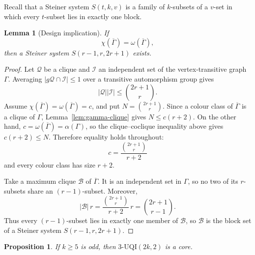 \documentclass[11pt]{article}
\newtheorem{lemma}[theorem]{Lemma}
\newtheorem{proposition}[theorem]{Proposition}
\begin{document}
Recall that a Steiner system \(S(t,k,v)\) is a family of \(k\)-subsets of a
\(v\)-set in which every \(t\)-subset lies in exactly one block.

\begin{lemma}[Design implication]\label{lem:design-implication}
If
\[
\chi(\overline{\Gamma})=\omega(\overline{\Gamma}),
\]
then a Steiner system \(S(r-1,r,2r+1)\) exists.
\end{lemma}

\begin{proof}
Let \(\mathcal Q\) be a clique and \(\mathcal I\) an independent set of the
vertex-transitive graph \(\Gamma\).  Averaging
\(|g\mathcal Q\cap\mathcal I|\le1\) over a transitive automorphism group gives
\[
|\mathcal Q||\mathcal I|\le\binom{2r+1}{r}.
\]
Assume \(\chi(\overline{\Gamma})=\omega(\overline{\Gamma})=c\), and put
\(N=\binom{2r+1}{r}\).  Since a colour class of \(\overline{\Gamma}\) is a
clique of \(\Gamma\), Lemma~\ref{lem:gamma-clique} gives
\(N\le c(r+2)\).  On the other hand,
\(c=\omega(\overline{\Gamma})=\alpha(\Gamma)\), so the clique--coclique
inequality above gives \(c(r+2)\le N\).  Therefore equality holds
throughout:
\[
c=\frac{\binom{2r+1}{r}}{r+2}
\]
and every colour class has size \(r+2\).

Take a maximum clique \(\mathcal B\) of \(\overline{\Gamma}\).  It is an
independent set in \(\Gamma\), so no two of its \(r\)-subsets share an
\((r-1)\)-subset.  Moreover,
\[
|\mathcal B|\,r
=\frac{\binom{2r+1}{r}}{r+2}\,r
=\binom{2r+1}{r-1}.
\]
Thus every \((r-1)\)-subset lies in exactly one member of \(\mathcal B\), so
\(\mathcal B\) is the block set of a Steiner system \(S(r-1,r,2r+1)\).
\end{proof}

\begin{proposition}\label{prop:mod2}
If \(k\ge5\) is odd, then \(3\text{-}\mathrm{UQI}(2k,2)\) is a core.
\end{proposition}
\end{document}
